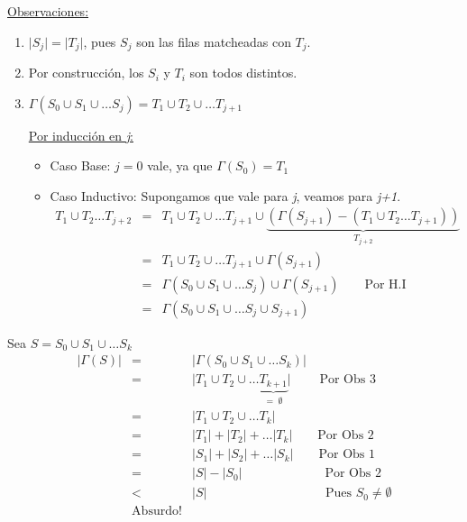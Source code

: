\documentclass[12pt,a4paper]{report}
\newcounter{neq}
\begin{document}
			\vspace{5mm}
			\underline{Observaciones:}
			\begin{enumerate}
				\item $\lvert S_{j} \rvert = \lvert T_{j} \rvert$, pues $S_{j}$ son las filas matcheadas con $T_{j}$.
				\item Por construcción, los $S_{i}$ y $T_{i}$ son todos distintos.
				\item $\Gamma(S_{0} \cup S_{1} \cup \dotsc S_{j}) = T_{1} \cup T_{2} \cup \dotsc T_{j+1}$
					\par \underline{Por inducción en \textit{j}:}
						\begin{itemize}
							\item Caso Base: $j = 0$ vale, ya que $\Gamma(S_{0}) = T_{1}$
							\item Caso Inductivo: Supongamos que vale para \textit{j}, veamos para \textit{j+1}.
								\begin{eqnarray}
									\nonumber T_{1} \cup T_{2} \dotsc T_{j + 2} &=& T_{1} \cup T_{2} \cup \dotsc T_{j + 1} \cup \underbrace{(\Gamma(S_{j + 1}) - (T_{1} \cup T_{2} \dotsc T_{j + 1}))}_{T_{j + 2}} \\
									\nonumber &=& T_{1} \cup T_{2} \cup \dotsc T_{j + 1} \cup \Gamma(S_{j + 1}) \\
									\nonumber &=& \Gamma(S_{0} \cup S_{1} \cup \dotsc S_{j}) \cup \Gamma(S_{j + 1}) \qquad \text{Por H.I} \\
									\nonumber &=& \Gamma(S_{0} \cup S_{1} \cup \dotsc S_{j} \cup S_{j + 1})
								\end{eqnarray}
						\end{itemize}
			\end{enumerate}

			\par Sea $S = S_{0} \cup S_{1} \cup \dotsc S_{k}$
				\begin{eqnarray}
					\nonumber \lvert \Gamma(S) \rvert &=& \lvert \Gamma(S_{0} \cup S_{1} \cup \dotsc S_{k}) \rvert \\
					\nonumber &=& \lvert T_{1} \cup T_{2} \cup \dotsc \underbrace{T_{k+1}}_{= \; \emptyset} \rvert \qquad \; \text{Por Obs 3} \\
					\nonumber &=& \lvert T_{1} \cup T_{2} \cup \dotsc T_{k} \rvert \\
					\nonumber &=& \lvert T_{1} \rvert + \lvert T_{2} \rvert + \dotsc \lvert T_{k} \rvert \qquad \text{Por Obs 2} \\
					\nonumber &=& \lvert S_{1} \rvert + \lvert S_{2} \rvert + \dotsc \lvert S_{k} \rvert \qquad \text{Por Obs 1} \\
					\nonumber &=& \lvert S \rvert - \lvert S_{0} \rvert \qquad \qquad \qquad \; \; \text{Por Obs 2} \\
					\nonumber &<& \lvert S \rvert \qquad \qquad \qquad \qquad \; \; \; \; \;\text{Pues } S_{0} \neq \emptyset \\
					\nonumber & \text{Absurdo!} &
				\end{eqnarray}
\end{document}
